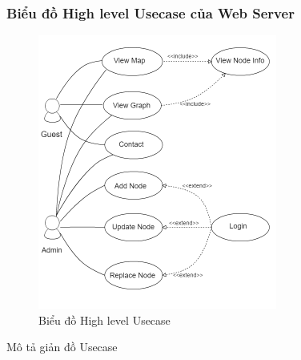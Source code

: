 \subsubsection*{Biểu đồ High level Usecase của Web Server}

\begin{figure}[H]
\centering    
\includegraphics[width=0.7\textwidth]{usecase_diagram}
\caption[Biểu đồ High level Usecase]{Biểu đồ High level Usecase }
\label{fig:usecase_diagram}
\end{figure}

Mô tả giản đồ Usecase

